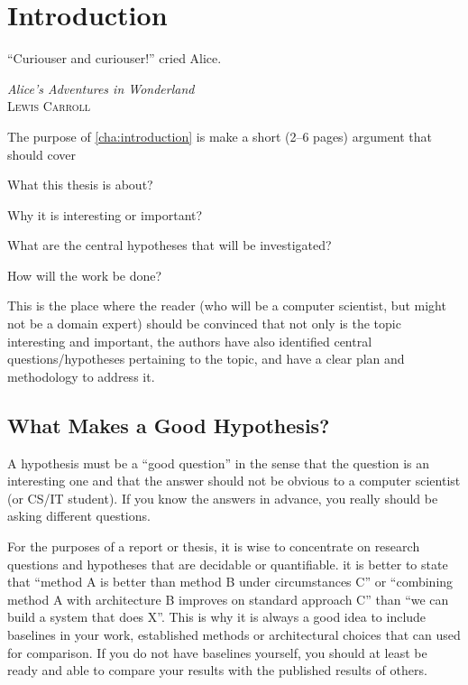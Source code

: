 \chapter{Introduction}
\label{cha:introduction}
\epigraph{``Curiouser and curiouser!'' cried Alice.}{\textit{Alice’s Adventures in Wonderland}\\\textsc{Lewis Carroll}}

The purpose of \autoref{cha:introduction} is make a short (2--6 pages)
argument that should cover
\begin{aenumerate}
\item What this thesis is about?
\item Why it is interesting or important?
\item What are the central hypotheses that will be investigated?
\item How will the work be done?
\end{aenumerate}

This is the place where the reader (who will be a computer scientist, but
might not be a domain expert) should be convinced that not only is the topic
interesting and important, the authors have also identified central
questions/hypotheses pertaining to the topic, and have a clear plan and
methodology to address it.

\section{What Makes a Good Hypothesis?}
\label{sec:what-makes-good}

A hypothesis must be a ``good question'' in the sense that the question is
an interesting one and that the answer should not be obvious to a computer
scientist (or CS/IT student).  If you know the answers in advance, you
really should be asking different questions.

For the purposes of a report or thesis, it is wise to concentrate on
research questions and hypotheses that are decidable or quantifiable. \Eg it
is better to state that ``method A is better than method B under
circumstances C'' or ``combining method A with architecture B improves on
standard approach C'' than ``we can build a system that does X''.  This is
why it is always a good idea to include baselines in your work, \ie
established methods or architectural choices that can used for
comparison. If you do not have baselines yourself, you should at least be
ready and able to compare your results with the published results of others.

